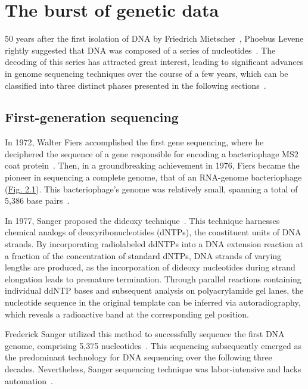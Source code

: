 \section{The burst of genetic data}

50 years after the first isolation of \acrshort{DNA} by Friedrich Mietscher~\citep{heather_sequence_2016}, Phoebus Levene rightly suggested that \acrshort{DNA} was composed of a series of nucleotides~\citep{levene_structure_1919, simoni_structure_2002}. The decoding of this series has attracted great interest, leading to significant advances in genome sequencing techniques over the course of a few years, which can be classified into three distinct phases presented in the following sections~\citep{hutchison_dna_2007, mukhopadhyay_dna_2009, ebertz_journey_2020, giani_long_2020}.

\subsection{First-generation sequencing}

In 1972, Walter Fiers accomplished the first gene sequencing, where he deciphered the sequence of a gene responsible for encoding a bacteriophage MS2 coat protein~\citep{jou_nucleotide_1972}. Then, in a groundbreaking achievement in 1976, Fiers became the pioneer in sequencing a complete genome, that of an \acrshort{RNA}-genome bacteriophage (\hyperref[fig:chronology_bioevol]{Fig. 2.1}). This bacteriophage's genome was relatively small, spanning a total of 5,386 base pairs~\citep{fiers_complete_1976}.

In 1977, Sanger proposed the dideoxy technique~\citep{sanger_dna_1977}. This technique harnesses chemical analogs of deoxyribonucleotides (dNTPs), the constituent units of \acrshort{DNA} strands. By incorporating radiolabeled ddNTPs into a \acrshort{DNA} extension reaction at a fraction of the concentration of standard dNTPs, DNA strands of varying lengths are produced, as the incorporation of dideoxy nucleotides during strand elongation leads to premature termination. Through parallel reactions containing individual ddNTP bases and subsequent analysis on polyacrylamide gel lanes, the nucleotide sequence in the original template can be inferred via autoradiography, which reveals a radioactive band at the corresponding gel position.

Frederick Sanger utilized this method to successfully sequence the first \acrshort{DNA} genome, comprising 5,375 nucleotides~\citep{sanger_nucleotide_1977}. This sequencing subsequently emerged as the predominant technology for \acrshort{DNA} sequencing over the following three decades. Nevertheless, Sanger sequencing technique was labor-intensive and lacks automation~\citep{metzker_emerging_2005, hutchison_dna_2007}.

